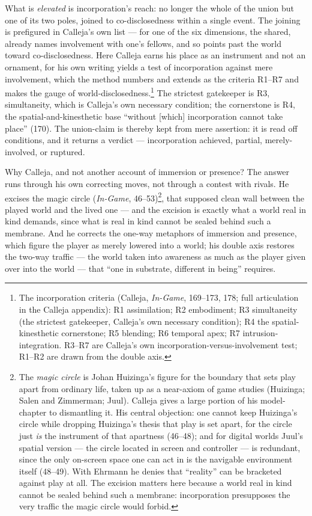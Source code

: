 \documentclass{article}
\begin{document}
What is \textit{elevated} is incorporation's reach: no longer the whole of the union but one of its two poles, joined to co-disclosedness within a single event. The joining is prefigured in Calleja's own list — for one of the six dimensions, the shared, already names involvement with one's fellows, and so points past the world toward co-disclosedness. Here Calleja earns his place as an instrument and not an ornament, for his own writing yields a test of incorporation against mere involvement, which the method numbers and extends as the criteria R1–R7 and makes the gauge of world-disclosedness.\footnote{The incorporation criteria (Calleja, \textit{In-Game}, 169–173, 178; full articulation in the Calleja appendix): R1 assimilation; R2 embodiment; R3 simultaneity (the strictest gatekeeper, Calleja's own necessary condition); R4 the spatial-kinesthetic cornerstone; R5 blending; R6 temporal apex; R7 intrusion-integration. R3–R7 are Calleja's own incorporation-versus-involvement test; R1–R2 are drawn from the double axis.} The strictest gatekeeper is R3, simultaneity, which is Calleja's own necessary condition; the cornerstone is R4, the spatial-and-kinesthetic base ``without [which] incorporation cannot take place'' (170). The union-claim is thereby kept from mere assertion: it is read off conditions, and it returns a verdict — incorporation achieved, partial, merely-involved, or ruptured.

Why Calleja, and not another account of immersion or presence? The answer runs through his own correcting moves, not through a contest with rivals. He excises the magic circle (\textit{In-Game}, 46–53)\footnote{The \textit{magic circle} is Johan Huizinga's figure for the boundary that sets play apart from ordinary life, taken up as a near-axiom of game studies (Huizinga; Salen and Zimmerman; Juul). Calleja gives a large portion of his model-chapter to dismantling it. His central objection: one cannot keep Huizinga's circle while dropping Huizinga's thesis that play is set apart, for the circle just \textit{is} the instrument of that apartness (46–48); and for digital worlds Juul's spatial version — the circle located in screen and controller — is redundant, since the only on-screen space one can act in is the navigable environment itself (48–49). With Ehrmann he denies that ``reality'' can be bracketed against play at all. The excision matters here because a world real in kind cannot be sealed behind such a membrane: incorporation presupposes the very traffic the magic circle would forbid.}, that supposed clean wall between the played world and the lived one — and the excision is exactly what a world real in kind demands, since what is real in kind cannot be sealed behind such a membrane. And he corrects the one-way metaphors of immersion and presence, which figure the player as merely lowered into a world; his double axis restores the two-way traffic — the world taken into awareness as much as the player given over into the world — that ``one in substrate, different in being'' requires.
\end{document}
